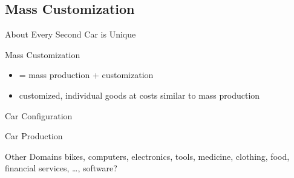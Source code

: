 \subsection{Mass Customization}
\begin{frame}{About Every Second Car is Unique}
	\centering{}
\end{frame}
\begin{frame}[label=MassCustomization]{\myframetitle}
	\begin{fancycolumns}[widths={45}]
		\begin{definition}{Mass Customization}
			\begin{itemize}
			\item = mass production + customization
			\item customized, individual goods at costs similar to mass production
			\end{itemize}
		\end{definition}
		\begin{exampletight}{Car Configuration}
		\end{exampletight}
	\nextcolumn
		\begin{exampletight}{Car Production}
		\end{exampletight}
		\begin{example}{Other Domains}
			bikes, computers, electronics, tools, medicine, clothing, food, financial services, \ldots, software?
		\end{example}
	\end{fancycolumns}
\end{frame}

